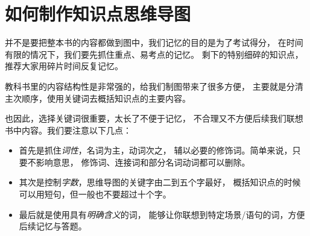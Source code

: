 \documentclass[../main.tex]{subfiles}
\begin{document}
\section{如何制作知识点思维导图}
\begin{cuenotes}
\end{cuenotes}

并不是要把整本书的内容都做到图中，我们记忆的目的是为了考试得分，
在时间有限的情况下，我们要先抓住重点、易考点的记忆。
剩下的特别细碎的知识点，推荐大家用碎片时间反复记忆。

教科书里的内容结构性是非常强的，给我们制图带来了很多方便，
主要就是分清主次顺序，使用关键词去概括知识点的主要内容。

也因此，选择关键词很重要，太长了不便于记忆，
不合理又不方便后续我们联想书中内容。我们要注意以下几点：
\begin{itemize}
  \item 首先是抓住\emph{词性}，名词为主，动词次之，
    辅以必要的修饰词。简单来说，只要不影响意思，
    修饰词、连接词和部分名词动词都可以删除。
  \item 其次是控制\emph{字数}，思维导图的关键字由二到五个字最好，
    概括知识点的时候可以用短句，但一般也不要超过十个字。
  \item 最后就是使用具有\emph{明确含义}的词，
    能够让你联想到特定场景/语句的词，方便后续记忆与答题。
\end{itemize}
%
\end{document}

